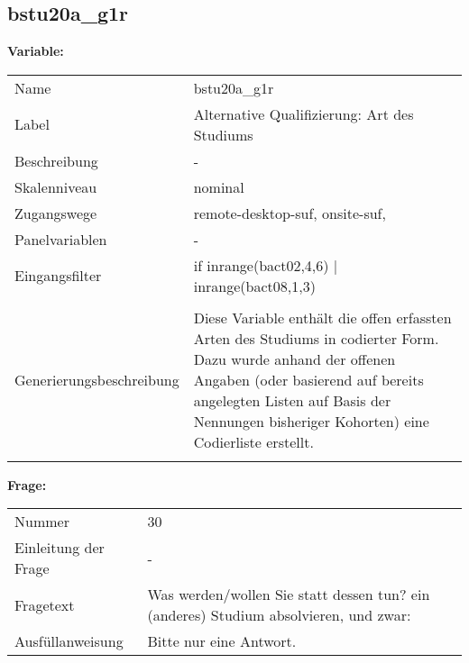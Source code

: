 	
	
	\subsection{bstu20a\_g1r}
	\label{subSection:bstu20a_g1r}

	\noindent\textbf{Variable:}\\
		\begin{tabular}{lL{11.3cm}}
			\label{tableVariable:bstu20a_g1r}
			Name & bstu20a\_g1r \\
			Label & Alternative Qualifizierung: Art des Studiums \\
			Beschreibung & - \\
			Skalenniveau & nominal \\
			Zugangswege &
				remote-desktop-suf,
				onsite-suf,
 \\
			Panelvariablen & -
			 \\
			Eingangsfilter & if inrange(bact02,4,6) | inrange(bact08,1,3) \\
 \\
					Generierungsbeschreibung & Diese Variable enthält die offen erfassten Arten des Studiums in codierter Form. Dazu wurde anhand der offenen Angaben (oder basierend auf bereits angelegten Listen auf Basis der Nennungen bisheriger Kohorten) eine Codierliste erstellt.
				 \\	
			 \\
		\end{tabular}

		\vspace*{1 cm}
		\noindent\textbf{Frage:}\\
		\begin{tabular}{lL{11.3cm}}
			\label{tableQuestion:bstu20a_g1r}
			Nummer & 30 \\
			Einleitung der Frage & - \\
			Fragetext & Was werden/wollen Sie statt dessen tun?
ein (anderes) Studium absolvieren, und zwar: \\
			Ausfüllanweisung & Bitte nur eine Antwort. \\
		\end{tabular}





